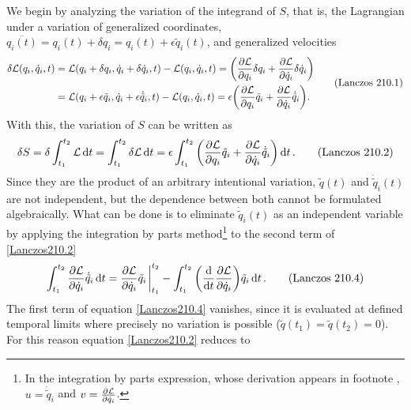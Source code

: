 \documentclass[12pt, english, a4paper]{article}
\begin{document}
We begin by analyzing the variation of the integrand of \(S\), that is, the Lagrangian under a variation of generalized coordinates, \(\overline{q_i (t)}= q_i(t) + \delta q_i = q_i (t)+ \epsilon \tilde{q}_i (t)\), and generalized velocities
\begin{equation}\label{Lanczos210.1}
	\begin{aligned}
		\delta \mathcal{L}(q_i, \dot{q}_i, t)
		&= \mathcal{L}(q_i+ \delta{q}_i, \dot{q}_i+ \delta \dot{q}_i, t) - \mathcal{L}(q_i, \dot{q}_i, t)
		= \pqty{\pdv{\mathcal{L}}{q_i} \delta q_i + \pdv{\mathcal{L}}{\dot{q}_i} \delta \dot{q}_i } \notag \\
		&= \mathcal{L}(q_i+ \epsilon \tilde{q}_i, \dot{q}_i+ \epsilon \dot{\tilde{q}}_i, t) - \mathcal{L}(q_i, \dot{q}_i, t)
		= \epsilon \pqty{\pdv{\mathcal{L}}{q_i} \tilde{q}_i + \pdv{\mathcal{L}}{\dot{q}_i} \dot{\tilde{q}}_i }.
	\end{aligned}
  \tag{Lanczos 210.1}
\end{equation}
With this, the variation of \(S\) can be written as
\begin{equation}\label{Lanczos210.2}
    \delta S= \delta \int_{t_1}^{t_2 } \mathcal{L} \dd{t} = \int_{t_1}^{t_2 } \delta \mathcal{L} \dd{t} =
    \epsilon \int_{t_1}^{t_2 } \pqty{\pdv{\mathcal{L}}{q_i} \tilde{q}_i + \pdv{\mathcal{L}}{\dot{q}_i} \dot{\tilde{q}}_i } \dd{t}.
    \tag{Lanczos 210.2}
\end{equation}
Since they are the product of an arbitrary intentional variation, \(\tilde{q}(t)\) and \(\dot{\tilde{q}}_i(t)\) are not independent, but the dependence between both cannot be formulated algebraically.
What can be done is to eliminate \(\dot{\tilde{q}}_i (t)\) as an independent variable by applying the integration by parts method\footnote{In the integration by parts expression, whose derivation appears in footnote , \(u = \dot{\tilde{q}}_i \) and \(v = \pdv{\mathcal{L}}{\dot{q}_i} \).} to the second term of \eqref{Lanczos210.2}
\begin{equation}\label{Lanczos210.4}
    \int_{t_1}^{t_2 } \pdv{\mathcal{L}}{\dot{q}_i} \dot{\tilde{q}}_i \dd{t} =
    \pdv{\mathcal{L}}{\dot{q}_i} \tilde{q}_i \eval_{t_1}^{t_2} - \int_{t_1}^{t_2 } \pqty{ \dv{t} \pdv{\mathcal{L}}{\dot{q}_i} } \tilde{q}_i \dd{t}.
    \tag{Lanczos 210.4}
\end{equation}
The first term of equation \eqref{Lanczos210.4} vanishes, since it is evaluated at defined temporal limits where precisely no variation is possible (\(\tilde{q}(t_1)= \tilde{q}(t_2)= 0\)).
For this reason equation \eqref{Lanczos210.2} reduces to
\end{document}
